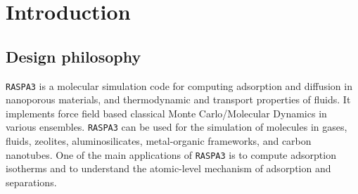 \chapter{Introduction}


\section{Design philosophy}

\texttt{RASPA3} is a molecular simulation code for computing adsorption and diffusion in nanoporous materials, 
and thermodynamic and transport properties of fluids. 
It implements force field based classical Monte Carlo/Molecular Dynamics in various ensembles.
\texttt{RASPA3} can be used for the simulation of molecules in gases, fluids, zeolites, aluminosilicates,
metal-organic frameworks, and carbon nanotubes.
One of the main applications of \texttt{RASPA3} is to compute adsorption isotherms and to 
understand the atomic-level mechanism of adsorption and separations.


